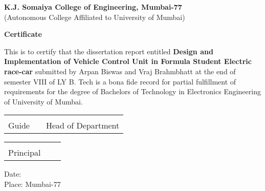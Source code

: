 
    \begin{center}
    
        \vspace*{0.1cm}
        \large
        \textbf{K.J. Somaiya College of Engineering, Mumbai-77}\\
        \normalsize
        (Autonomous College Affiliated to University of Mumbai)\\
        
        \vspace{0.8cm}
        
        \large
        \textbf{Certificate}\\
        \vspace{0.5cm}
        
    \end{center}
\noindent
{\large This is to certify that the dissertation report entitled \textbf{Design and Implementation of Vehicle Control Unit in Formula Student Electric race-car} submitted by Arpan Biswas and Vraj Brahmbhatt at the end of semester VIII of LY B. Tech is a bona fide record for partial fulfillment of requirements for the degree of Bachelors of Technology in Electronics Engineering of University of Mumbai.}
\vspace{2cm}

\begin{table}[h]
\centering
\begin{tabular}{Y Y Y}
\hrulefill & & \hrulefill \\
\large Guide & & \large Head of Department \\
\end{tabular}
\end{table}

\vspace{2cm}

\begin{table}[h]
\centering
\begin{tabular}{Y Y Y}
\hrulefill & & \\
\large Principal & & \\
\end{tabular}
\end{table}

\vspace{1cm}
\noindent
{\large Date:}\\
{\large Place: Mumbai-77}

